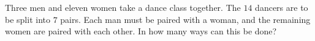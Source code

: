 Three men and eleven women take a dance class together. The $14$ dancers are to be split into $7$ pairs. Each man must be paired with a woman, and the remaining women are paired with each other. In how many ways can this be done?
